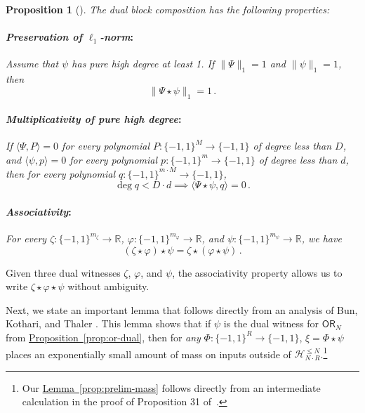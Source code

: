 \documentclass[11pt]{article}
\numberwithin{equation}{section}
\newtheorem{proposition}[theorem]{Proposition}
\theoremstyle{definition}
\theoremstyle{plain}
\newcommand{\R}{\mathbb R}
\newcommand{\expref}[2]{\hyperref[#2]{#1~\ref{#2}}}
\newcommand{\OR}{\mathsf{ OR}}
\newcommand{\bits}{\{-1,1\}}
\newcommand{\ls}{\star}
\begin{document}
\begin{proposition}[\!\cite{sherstovhalfspaces1,adegsurj}] \label{prop:ls}
	\label{prop12}
	The dual block composition %
has  %
the following properties:
	\paragraph{\emph{Preservation of $\ell_1$-norm}:} Assume that $\psi$ has pure high degree at least 1.
	If $\|\Psi\|_1 = 1$ and $\|\psi\|_1 = 1$, then
	\begin{equation}\|\Psi \ls \psi\|_1 = 1\,. \label{eqn:ls-norm}\end{equation}
	
	\paragraph{\emph{Multiplicativity of pure high degree}:} If $\langle \Psi, P \rangle = 0$ for every polynomial $P \colon \bits^M \to \bits$ of degree less than  $D$, and $\langle \psi, p \rangle = 0$ for every polynomial $p \colon \bits^m \to \bits$ of degree less than $d$, then
	for every polynomial $q \colon \bits^{m \cdot M} \to \bits$,
	\begin{equation}\deg q < D \cdot d \implies \langle \Psi \ls \psi, q \rangle = 0\,. \label{eqn:ls-phd} \end{equation}
	
	\paragraph{\emph{Associativity}:} For every $\zeta: \bits^{m_\zeta} \to \R$, $\varphi: \bits^{m_\varphi} \to \R$, and $\psi: \bits^{m_\psi} \to \R$, we have
	\begin{equation} (\zeta \ls \varphi) \ls \psi = \zeta \ls (\varphi \ls \psi)\,. \label{eqn:ls-assoc} \end{equation}
\end{proposition}

Given three dual witnesses $\zeta$, $\varphi$, and $\psi$, the associativity property allows us to write $\zeta \ls \varphi \ls \psi$ without ambiguity.

Next, we state an important lemma that follows directly from an analysis of Bun, Kothari, and Thaler \cite[Proof of Proposition 31]{bkt}.
This lemma shows that if $\psi$ is the dual witness for $\OR_N$
from \expref{Proposition}{prop:or-dual}, then for \emph{any} $\Phi \colon \bits^R \to \bits$, $\xi = \Phi \ls \psi$ places an exponentially small amount of mass on inputs outside of $\mathcal{H}^{\le N}_{N \cdot R}$.\footnote{Our \expref{Lemma}{prop:prelim-mass} follows directly from an intermediate calculation in the proof of Proposition 31 of~\cite{bkt}.}
\end{document}
